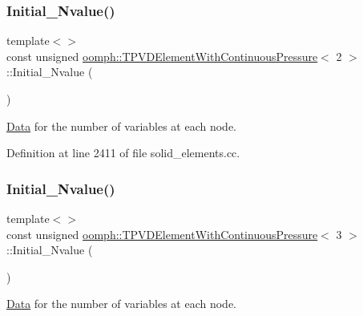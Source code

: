 \subsubsection{\texorpdfstring{Initial\+\_\+\+Nvalue()}{Initial\_Nvalue()}\hspace{0.1cm}{\footnotesize\ttfamily [1/2]}}
{\footnotesize\ttfamily template$<$$>$ \\
const unsigned \hyperlink{classoomph_1_1TPVDElementWithContinuousPressure}{oomph\+::\+T\+P\+V\+D\+Element\+With\+Continuous\+Pressure}$<$ 2 $>$\+::Initial\+\_\+\+Nvalue (\begin{DoxyParamCaption}{ }\end{DoxyParamCaption})\hspace{0.3cm}{\ttfamily [private]}}



\hyperlink{classoomph_1_1Data}{Data} for the number of variables at each node. 



Definition at line 2411 of file solid\+\_\+elements.\+cc.

\mbox{\label{classoomph_1_1TPVDElementWithContinuousPressure_ae5bcebb0597dd1cd202a5b0a2503b235}} 
\subsubsection{\texorpdfstring{Initial\+\_\+\+Nvalue()}{Initial\_Nvalue()}\hspace{0.1cm}{\footnotesize\ttfamily [2/2]}}
{\footnotesize\ttfamily template$<$$>$ \\
const unsigned \hyperlink{classoomph_1_1TPVDElementWithContinuousPressure}{oomph\+::\+T\+P\+V\+D\+Element\+With\+Continuous\+Pressure}$<$ 3 $>$\+::Initial\+\_\+\+Nvalue (\begin{DoxyParamCaption}{ }\end{DoxyParamCaption})\hspace{0.3cm}{\ttfamily [private]}}



\hyperlink{classoomph_1_1Data}{Data} for the number of variables at each node. 



